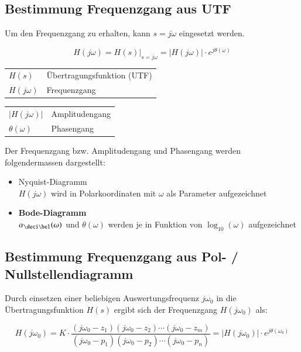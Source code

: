 \subsection{Bestimmung Frequenzgang aus UTF}

Um den Frequenzgang zu erhalten, kann $s = j \omega$ eingesetzt werden.

$$ \boxed{ H(j \omega) = H(s) \Big|_{s = j \omega} = |H(j \omega)| \cdot e^{j \theta(\omega)} } $$

\begin{center}
    \begin{tabular}{ll}
        $H(s)$              & Übertragungsfunktion (UTF) \\
        $H(j \omega)$       & Frequenzgang 
    \end{tabular}\hspace{5mm}
    \begin{tabular}{ll}
        $|H(j \omega)|$     & Amplitudengang \\
        $\theta(\omega)$    & Phasengang
    \end{tabular}
\end{center}

Der Frequenzgang bzw. Amplitudengang und Phasengang werden folgendermassen dargestellt:

\begin{itemize}
    \item Nyquist-Diagramm \\
        $H(j \omega)$ wird in Polarkoordinaten mit $\omega$ als Parameter aufgezeichnet 
    \item \textbf{Bode-Diagramm} \\
        $\alpha_{\deci \bel}(\omega)$ und $\theta(\omega)$ werden je in Funktion von $\log_{10}(\omega)$ aufgezeichnet
\end{itemize}


\subsection{Bestimmung Frequenzgang aus Pol- / Nullstellendiagramm}

Durch einsetzen einer beliebigen Auswertungsfrequenz $j \omega_0$ in die Übertragungsfunktion $H(s)$ ergibt sich der
Frequenzgang $H(j \omega_0)$ als:

$$ H(j \omega_0) = K \cdot \frac{(j \omega_0 - z_1) (j \omega_0 - z_2) \cdots (j \omega_0 - z_m)}
                                {(j \omega_0 - p_1) (j \omega_0 - p_2) \cdots (j \omega_0 - p_n)}
                                = | H(j \omega_0) | \cdot e^{j \theta (\omega_0)} $$

